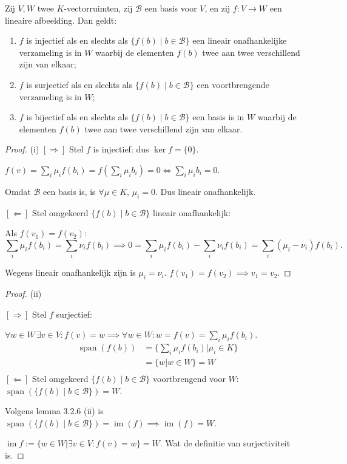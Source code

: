 \begin{stelling}[3.3.1]
    Zij $V, W$ twee $K$-vectorruimten, zij $\mathcal{B}$ een basis voor $V$, en zij $f \colon V \to W$ een lineaire afbeelding. Dan geldt:
    \begin{enumerate}
        \item[(i)] $f$ is injectief als en slechts als $\{f(b) \mid b \in \mathcal{B}\}$ een lineair onafhankelijke verzameling is in $W$ waarbij de elementen $f(b)$ twee aan twee verschillend zijn van elkaar;
        \item[(ii)] $f$ is surjectief als en slechts als $\{f(b) \mid b \in \mathcal{B}\}$ een voortbrengende verzameling is in $W$;
        \item[(iii)] $f$ is bijectief als en slechts als $\{f(b) \mid b \in \mathcal{B}\}$ een basis is in $W$ waarbij de elementen $f(b)$ twee aan twee verschillend zijn van elkaar.
    \end{enumerate}
\end{stelling}
\begin{proof}(i)
    \([\Rightarrow]\) Stel \(f\) is injectief: dus \(\ker f = \{0\}\).

     \(f(v) = \sum_i \mu_i f(b_i) = f(\sum_i \mu_i b_i) =0 \iff \sum_i \mu_i b_i = 0.\)

     Omdat \(\mathcal{B}\) een basis is, is \(\forall \mu \in K, \, \mu_i = 0\). Dus lineair onafhankelijk.

    \([\Leftarrow]\) Stel omgekeerd \(\{f(b) \mid b \in \mathcal{B}\}\) lineair onafhankelijk:

    Als \(f(v_1) = f(v_2)\):
    \[
        \sum_{i} \mu_i f(b_i) = \sum_{i} \nu_i f(b_i)
        \implies 0= \sum_{i} \mu_i f(b_i) - \sum_{i} \nu_i f(b_i)
        = \sum_{i} \left( \mu_i  -  \nu_i \right) f(b_i).
    \]
    
    Wegens lineair onafhankelijk zijn is \(\mu_i = \nu_i\).
    \(  f(v_1) = f(v_2)  \implies v_1 = v_2\).
\end{proof}
\begin{proof}(ii)

     \([\Rightarrow]\) Stel \(f\) surjectief:

     \(\forall w \in W \, \exists v \in V: f(v) = w 
     \implies \forall w \in W: w = f(v) = \sum_{i} \mu_i f(b_i)\).
     \begin{align*}
        \operatorname{span}(f(b)) 
        &= \{\sum_{i} \mu_i f(b_i) | \mu_i \in K\}\\
        &= \{w | w \in W\} = W\\
     \end{align*}
    \([\Leftarrow]\) Stel omgekeerd \(\{f(b) \mid b \in \mathcal{B}\}\) voortbrengend voor \(W\):
    \(
    \operatorname{span}(\{f(b)\mid b \in \mathcal{B}\}) = W.
    \)

    Volgens lemma 3.2.6 (ii) is \(\operatorname{span}(\{f(b)\mid b \in \mathcal{B}\}) = \operatorname{im}(f)\implies \operatorname{im}(f) =W\).
    
    \(\operatorname{im}f := \{w \in W | \exists v \in V: f(v) = w\} = W\).
     Wat de definitie van surjectiviteit is.
\end{proof}
